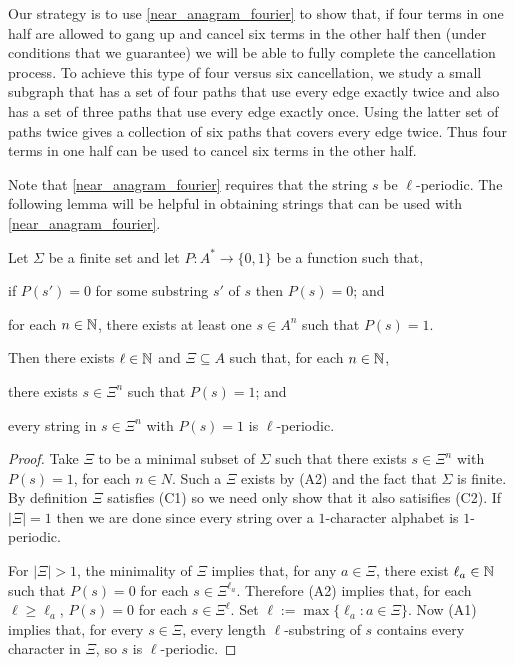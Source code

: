 \documentclass{patmorin}
\begin{document}
Our strategy is to use \cref{near_anagram_fourier} to show that, if four terms in one half are allowed to gang up and cancel six terms in the other half then (under conditions that we guarantee) we will be able to fully complete the cancellation process.  To achieve this type of four versus six cancellation, we study a small subgraph that has a set of four paths that use every edge exactly twice and also has a set of three paths that use every edge exactly once.  Using the latter set of paths twice gives a collection of six paths that covers every edge twice.  Thus four terms in one half can be used to cancel six terms in the other half.

Note that \cref{near_anagram_fourier} requires that the string $s$ be $\ell$-periodic.  The following lemma will be helpful in obtaining strings that can be used with \cref{near_anagram_fourier}.

\begin{lem}\label{periodicity}
    Let $\Sigma$ be a finite set and let $P:A^*\to\{0,1\}$ be a function such that,
    \begin{compactenum}[({A}1)]
        \item if $P(s')=0$ for some substring $s'$ of $s$ then $P(s)=0$; and
        \item for each $n\in\mathbb{N}$, there exists at least one $s\in A^n$ such that $P(s)=1$.
    \end{compactenum}
    Then there exists $\ell\in\mathbb{N}$ and $\Xi\subseteq A$ such that, for each $n\in\mathbb{N}$,
    \begin{compactenum}[(C1)]
        \item there exists $s\in\Xi^n$ such that $P(s)=1$; and
        \item every string in $s\in\Xi^n$ with $P(s)=1$ is $\ell$-periodic.
    \end{compactenum}
\end{lem}

\begin{proof}
    Take $\Xi$ to be a minimal subset of $\Sigma$ such that there exists $s\in\Xi^n$ with $P(s)=1$, for each $n\in N$.  Such a $\Xi$ exists by (A2) and the fact that $\Sigma$ is finite. By definition $\Xi$ satisfies (C1) so we need only show that it also satisifies (C2).  If $|\Xi|=1$ then we are done since every string over a $1$-character alphabet is $1$-periodic.

    For $|\Xi|>1$, the minimality of $\Xi$ implies that, for any $a\in\Xi$, there exist $\ell_a\in\mathbb{N}$ such that $P(s)=0$ for each $s\in\Xi^{\ell_a}$.  Therefore (A2) implies that, for each $\ell\ge\ell_a$, $P(s)=0$ for each $s\in\Xi^{\ell}$. Set $\ell:=\max\{\ell_a:a\in \Xi\}$.  Now (A1) implies that, for every $s\in\Xi$, every length $\ell$-substring of $s$ contains every character in $\Xi$, so $s$ is $\ell$-periodic.
\end{proof}
\end{document}

